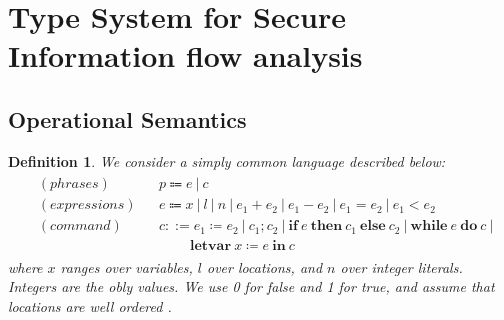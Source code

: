 \documentclass{article}
\newtheorem{definition}[theorem]{Definition}
\newcommand{\ifelse}[3]{\ensuremath{\textbf{if}~#1~\textbf{then}~#2~\textbf{else}~#3}}
\newcommand{\newwhiledo}[2]{\ensuremath{\textbf{while}~#1~\textbf{do}~#2}}
\newcommand{\letvar}[2]{\ensuremath{\textbf{letvar}~#1~\textbf{in}~#2}}
\begin{document}
\newpage
\section{Type System for Secure Information flow analysis}

\subsection{Operational Semantics}

\begin{definition}
\rm We consider a simply common language described below:
\[
	\begin{gathered}
	\begin{aligned}
	&(phrases) && p \Coloneqq e~|~c \\
	&(expressions) && e \Coloneqq x ~|~ l ~|~ n ~|~ e_1 + e_2 ~|~ e_1 - e_2 ~|~ e_1 = e_2 ~|~ e_1 < e_2 \\
	&(command) && c ::= e_1 \coloneqq e_2 ~|~ c_1;c_2 ~|~ \ifelse{e}{c_1}{c_2} ~|~ \newwhiledo{e}{c} ~| \\
	&&&\quad\quad~ \letvar{x \coloneqq e}{c}
	\end{aligned}
	\end{gathered}
\]
where $x$ ranges over variables, $l$ over locations, and $n$ over integer literals. Integers are the obly values. We use 0 for false and 1 for true, and assume that locations are well ordered \cite{DGC}.
\end{definition}
\end{document}
